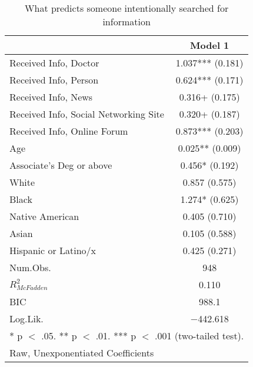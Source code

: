 \begin{table}[ht]
\caption{\label{tab:table-model-1}What predicts someone intentionally searched for information}
\centering
\begin{tabular}{lc}
\toprule
  & Model 1\\
\midrule
Received Info, Doctor & \num{1.037}*** (\num{0.181})\\
Received Info, Person & \num{0.624}*** (\num{0.171})\\
Received Info, News & \num{0.316}+ (\num{0.175})\\
Received Info, Social Networking Site & \num{0.320}+ (\num{0.187})\\
Received Info, Online Forum & \num{0.873}*** (\num{0.203})\\
Age & \num{0.025}** (\num{0.009})\\
Associate's Deg or above & \num{0.456}* (\num{0.192})\\
White & \num{0.857} (\num{0.575})\\
Black & \num{1.274}* (\num{0.625})\\
Native American & \num{0.405} (\num{0.710})\\
Asian & \num{0.105} (\num{0.588})\\
Hispanic or Latino/x & \num{0.425} (\num{0.271})\\
Num.Obs. & \num{948}\\
\midrule
$R_{McFadden}^2$ & \num{0.110}\\
BIC & \num{988.1}\\
Log.Lik. & \num{-442.618}\\
\bottomrule
\multicolumn{2}{l}{\rule{0pt}{1em}* p $<$ .05. ** p $<$ .01. *** p $<$ .001 (two-tailed test).}\\
\multicolumn{2}{l}{\rule{0pt}{1em}Raw, Unexponentiated Coefficients}\\
\end{tabular}
\end{table}